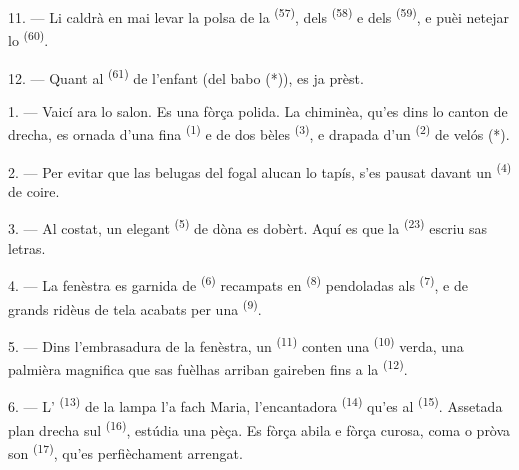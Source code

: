 

11. --- Li caldrà en mai levar la polsa de la 
\textsuperscript{(57)}, dels  \textsuperscript{(58)} e dels
 \textsuperscript{(59)}, e puèi netejar lo 
\textsuperscript{(60)}.

12. --- Quant al  \textsuperscript{(61)} de l'enfant (del babo (*)),
es ja prèst.

\VUsaut{5.0mm}
\VUsaut{3.0mm}

1. --- Vaicí ara lo salon. Es una  fòrça polida. La chiminèa,
qu'es dins lo canton de drecha, es ornada d'una fina 
\textsuperscript{(1)} e de dos bèles  \textsuperscript{(3)}, e
drapada d'un  \textsuperscript{(2)} de velós (*).

2. --- Per evitar que las belugas del fogal alucan lo tapís, s'es pausat davant
un  \textsuperscript{(4)} de coire.

3. --- Al costat, un elegant  \textsuperscript{(5)} de dòna es
dobèrt. Aquí es que la  \textsuperscript{(23)} escriu sas
letras.

4. --- La fenèstra es garnida de  \textsuperscript{(6)}
recampats en  \textsuperscript{(8)} pendoladas als
 \textsuperscript{(7)}, e de grands ridèus de tela acabats per una
 \textsuperscript{(9)}.

5. --- Dins l'embrasadura de la fenèstra, un 
\textsuperscript{(11)} conten una  \textsuperscript{(10)} verda, una
palmièra magnifica que sas fuèlhas arriban gaireben fins a la  \textsuperscript{(12)}.

6. --- L' \textsuperscript{(13)} de la lampa l'a fach Maria, l'encantadora
 \textsuperscript{(14)} qu'es al 
\textsuperscript{(15)}. Assetada plan drecha sul 
\textsuperscript{(16)}, estúdia una pèça. Es fòrça abila e fòrça curosa, coma o
pròva son  \textsuperscript{(17)}, qu'es perfièchament
arrengat.

